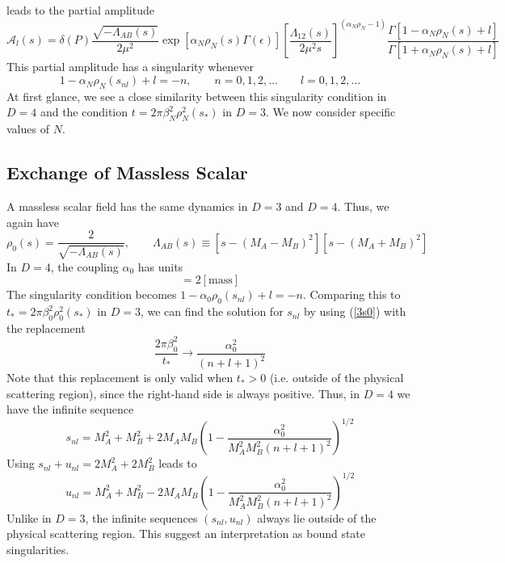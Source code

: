 leads to the partial amplitude
\begin{equation}
	\mathcal{A}_{l}(s) = \delta(P) \frac{\sqrt{- \Lambda_{AB}(s)}}{2 \mu^{2}} \exp{\left[ \alpha_{N} \rho_{N}(s) \Gamma(\epsilon) \right]} \left[ \frac{\Lambda_{12}(s)}{2 \mu^{2} s} \right]^{(\alpha_{N} \rho_{N} - 1)} \frac{\Gamma[1 - \alpha_{N} \rho_{N}(s) + l]}{\Gamma[1 + \alpha_{N} \rho_{N}(s) + l]}
\end{equation}
This partial amplitude has a singularity whenever
\begin{equation}
	1 - \alpha_{N} \rho_{N}(s_{nl}) + l = - n, \qquad n = 0, 1, 2, \ldots \qquad l = 0, 1, 2, \ldots
\end{equation}
At first glance, we see a close similarity between this singularity condition in $D = 4$ and the condition $t = 2 \pi \beta_{N}^{2} \rho_{N}^{2}(s_{*})$ in $D = 3$. We now consider specific values of $N$.
\subsection{Exchange of Massless Scalar}
A massless scalar field has the same dynamics in $D = 3$ and $D = 4$. Thus, we again have
\begin{equation}
	\rho_{0}(s) = \frac{2}{\sqrt{-\Lambda_{AB}(s)}}, \qquad \Lambda_{AB}(s) \equiv [s - (M_{A} - M_{B})^{2}] [s - (M_{A} + M_{B})^{2}] \label{rho0D4}
\end{equation}
In $D = 4$, the coupling $\alpha_{0}$ has units
\begin{equation}
	[\alpha_{0}] = 2 [\text{mass}]
\end{equation}
The singularity condition becomes $1 - \alpha_{0} \rho_{0}(s_{nl}) + l = -n$. Comparing this to $t_{*} = 2 \pi \beta_{0}^{2} \rho_{0}^{2}(s_{*})$ in $D = 3$, we can find the solution for $s_{nl}$ by using (\ref{3s0}) with the replacement
\begin{equation}
	\frac{2 \pi \beta_{0}^{2}}{t_{*}} \longrightarrow \frac{\alpha_{0}^{2}}{(n + l + 1)^{2}}
\end{equation}
Note that this replacement is only valid when $t_{*} > 0$ (i.e. outside of the physical scattering region), since the right-hand side is always positive. Thus, in $D = 4$ we have the infinite sequence
\begin{equation}
	s_{nl} = M_{A}^{2} + M_{B}^{2} + 2 M_{A} M_{B} \left(1 - \frac{\alpha_{0}^{2}}{M_{A}^{2} M_{B}^{2} (n + l + 1)^{2}} \right)^{1/2} \label{sJ0}
\end{equation}
Using $s_{nl} + u_{nl} = 2M_{A}^{2} + 2M_{B}^{2}$ leads to
\begin{equation}
	u_{nl} = M_{A}^{2} + M_{B}^{2} - 2 M_{A} M_{B} \left(1 - \frac{\alpha_{0}^{2}}{M_{A}^{2} M_{B}^{2} (n + l + 1)^{2}} \right)^{1/2}
\end{equation}
Unlike in $D = 3$, the infinite sequences $(s_{nl}, u_{nl})$ always lie outside of the physical scattering region. This suggest an interpretation as bound state singularities.

